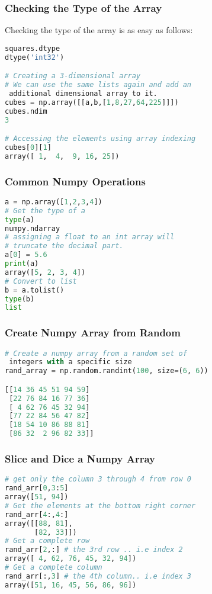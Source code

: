 \documentclass{beamer}
\begin{document}
\begin{frame}[fragile]
\frametitle{Checking the Type of the Array}
Checking the type of the array is as easy as follows:
\begin{lstlisting}[language=Python]
squares.dtype
dtype('int32')

# Creating a 3-dimensional array
# We can use the same lists again and add an
 additional dimensional array to it.
cubes = np.array([[a,b,[1,8,27,64,225]]])
cubes.ndim
3

# Accessing the elements using array indexing
cubes[0][1]
array([ 1,  4,  9, 16, 25])
\end{lstlisting}
\end{frame}

\begin{frame}[fragile]
\frametitle{Common Numpy Operations}

\begin{lstlisting}[language=Python]
a = np.array([1,2,3,4])
# Get the type of a 
type(a)
numpy.ndarray
# assigning a float to an int array will
# truncate the decimal part.
a[0] = 5.6
print(a)
array([5, 2, 3, 4])
# Convert to list
b = a.tolist()
type(b)
list

\end{lstlisting}
\end{frame}


\begin{frame}[fragile]
\frametitle{Create Numpy Array from Random}
\begin{lstlisting}[language=Python]
# Create a numpy array from a random set of
 integers with a specific size
rand_array = np.random.randint(100, size=(6, 6))

[[14 36 45 51 94 59]
 [22 76 84 16 77 36]
 [ 4 62 76 45 32 94]
 [77 22 84 56 47 82]
 [18 54 10 86 88 81]
 [86 32  2 96 82 33]]
\end{lstlisting}
\end{frame}

\begin{frame}[fragile]
\frametitle{Slice and Dice a Numpy Array}
\begin{lstlisting}[language=Python]
# get only the column 3 through 4 from row 0
rand_arr[0,3:5] 
array([51, 94])
# Get the elements at the bottom right corner
rand_arr[4:,4:]
array([[88, 81],
       [82, 33]])
# Get a complete row
rand_arr[2,:] # the 3rd row .. i.e index 2
array([ 4, 62, 76, 45, 32, 94])
# Get a complete column 
rand_arr[:,3] # the 4th column.. i.e index 3
array([51, 16, 45, 56, 86, 96])
\end{lstlisting}
\end{frame}
\end{document}
